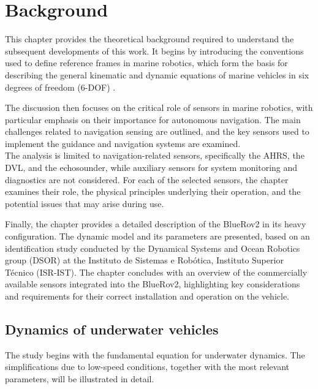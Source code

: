 \chapter{Background}
\label{chap:second}
\ifpdf
    \graphicspath{{Chapter2/Figures/PNG/}{Chapter2/Figures/PDF/}{Chapter2/Figures/}{Chapter2/Figures/EPS/}}
\else
    \graphicspath{{Chapter2/Figures/EPS/}{Chapter2/Figures/}}
\fi
This chapter provides the theoretical background required to understand the subsequent developments of this work. It begins by introducing the 
conventions used to define reference frames in marine robotics, which form the basis for describing the general kinematic and dynamic equations 
of marine vehicles in six degrees of freedom (6-DOF) \cite{fossenHandbookMarineCraft2011}.

The discussion then focuses on the critical role of sensors in marine robotics, with particular emphasis on their importance for autonomous 
navigation. The main challenges related to navigation sensing are outlined, and the key sensors used to implement the guidance and navigation 
systems are examined.\\
The analysis is limited to navigation-related sensors, specifically the AHRS, the DVL, and the echosounder, while auxiliary sensors for system 
monitoring and diagnostics are not considered. For each of the selected sensors, the chapter examines their role, the physical principles 
underlying their operation, and the potential issues that may arise during use.

Finally, the chapter provides a detailed description of the BlueRov2 in its heavy configuration. The dynamic model and its parameters are presented, 
based on an identification study conducted by the Dynamical Systems and Ocean Robotics group (DSOR) at the Instituto de Sistemas e Robótica, 
Instituto Superior Técnico (ISR-IST). The chapter concludes with an overview of the commercially available sensors integrated into the BlueRov2, 
highlighting key considerations and requirements for their correct installation and operation on the vehicle.

\section{Dynamics of underwater vehicles}
The study begins with the fundamental equation for underwater dynamics. The simplifications due to low-speed conditions, together with the most relevant 
parameters, will be illustrated in detail.

